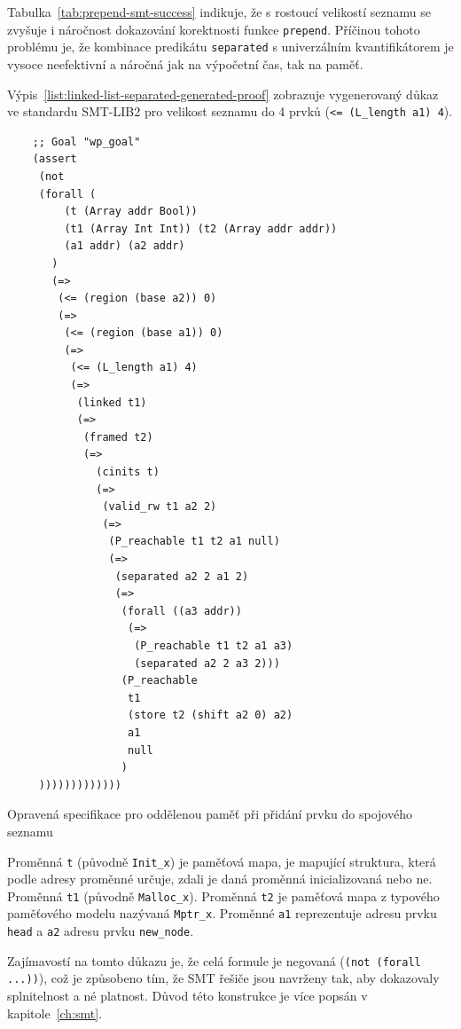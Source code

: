 Tabulka~\ref{tab:prepend-smt-success} indikuje,
že s rostoucí velikostí seznamu se zvyšuje i náročnost dokazování korektnosti funkce \texttt{prepend}.
Příčinou tohoto problému je, že kombinace predikátu \texttt{separated} s univerzálním kvantifikátorem
je vysoce neefektivní a náročná jak na výpočetní čas, tak na paměť.

Výpis~\ref{list:linked-list-separated-generated-proof}
zobrazuje vygenerovaný důkaz ve standardu SMT\mbox{-}LIB2
pro velikost seznamu do 4 prvků (\texttt{<= (L\_length a1) 4}).

\begin{listing}[H]
    \begin{verbatim}
    ;; Goal "wp_goal"
    (assert
     (not
     (forall (
         (t (Array addr Bool))
         (t1 (Array Int Int)) (t2 (Array addr addr))
         (a1 addr) (a2 addr)
       )
       (=>
        (<= (region (base a2)) 0)
        (=>
         (<= (region (base a1)) 0)
         (=>
          (<= (L_length a1) 4)
          (=>
           (linked t1)
           (=>
            (framed t2)
            (=>
              (cinits t)
              (=>
               (valid_rw t1 a2 2)
               (=>
                (P_reachable t1 t2 a1 null)
                (=>
                 (separated a2 2 a1 2)
                 (=>
                  (forall ((a3 addr))
                   (=>
                    (P_reachable t1 t2 a1 a3)
                    (separated a2 2 a3 2)))
                  (P_reachable
                   t1
                   (store t2 (shift a2 0) a2)
                   a1
                   null
                  )
     )))))))))))))
    \end{verbatim}
    \caption{Opravená specifikace pro oddělenou paměť při přidání prvku do spojového seznamu}
    \label{list:linked-list-separated-generated-proof}
\end{listing}

Proměnná \texttt{t} (původně \texttt{Init\_x}) je paměťová mapa,
je mapující struktura, která podle adresy proměnné určuje, zdali je daná proměnná inicializovaná nebo ne.
Proměnná \texttt{t1} (původně \texttt{Malloc\_x}).
Proměnná \texttt{t2} je paměťová mapa z typového paměťového modelu nazývaná \texttt{Mptr\_x}.
Proměnné \texttt{a1} reprezentuje adresu prvku \texttt{head} a \texttt{a2} adresu prvku \texttt{new\_node}.



Zajímavostí na tomto důkazu je,
že celá formule je negovaná (\texttt{(not (forall ...))}),
což je způsobeno tím, že SMT řešiče jsou navrženy tak,
aby dokazovaly splnitelnost a né platnost.
Důvod této konstrukce je více popsán v kapitole~\ref{ch:smt}.


